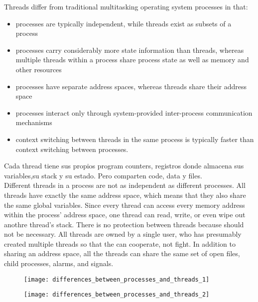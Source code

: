 \documentclass[a4paper, twoside]{article}
\begin{document}
Threads differ from traditional multitasking operating system processes in that:
\begin{itemize}
	\item processes are typically independent, while threads exist as subsets of a process
	\item processes carry considerably more state information than threads, whereas multiple threads within a process share process state as well as memory and other resources
	\item processes have separate address spaces, whereas threads share their address space
	\item processes interact only through system-provided inter-process communication mechanisms
	\item context switching between threads in the same process is typically faster than context switching between processes.
\end{itemize}

Cada thread tiene sus propios program counters, registros donde almacena sus variables,su stack y su estado. Pero comparten code, data y files.\\

Different threads in a process are not as independent as different processes. All threads have exactly the same address space, which means that they also share the same global variables. Since every thread can access every memory address within the process’ address space, one thread can read, write, or even wipe out anothre thread’s stack. There is no protection between threads because should not be necessary. All threads are owned by a single user, who has presumably created multiple threads so that the can cooperate, not fight. In addition to sharing an address space, all the threads can share the same set of open files, child processes, alarms, and signals.

\begin{figure}[H]
	\centering
	\texttt{[image: differences\_between\_processes\_and\_threads\_1]}
	\label{fig:differences_between_processes_and_threads_1}
\end{figure}

\begin{figure}[H]
	\centering
	\texttt{[image: differences\_between\_processes\_and\_threads\_2]}
	\label{fig:differences_between_processes_and_threads_2}
\end{figure}
\end{document}

